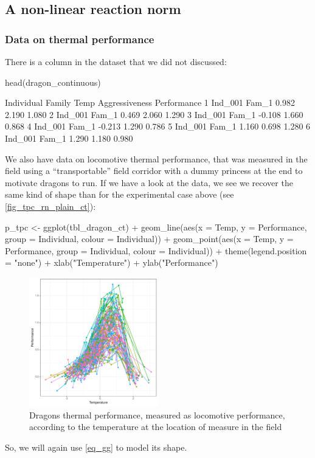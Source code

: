 \documentclass[a4paper,12pt,twoside]{article}
\begin{document}
\subsection{A non-linear reaction norm}

\subsubsection{Data on thermal performance}
There is a column in the dataset that we did not discussed:
\begin{Rinput}
head(dragon_continuous)
\end{Rinput}
\begin{Routput}
  Individual Family   Temp Aggressiveness Performance
1    Ind_001  Fam_1  0.982          2.190       1.080
2    Ind_001  Fam_1  0.469          2.060       1.290
3    Ind_001  Fam_1 -0.108          1.660       0.868
4    Ind_001  Fam_1 -0.213          1.290       0.786
5    Ind_001  Fam_1  1.160          0.698       1.280
6    Ind_001  Fam_1  1.290          1.180       0.980
\end{Routput}
We also have data on locomotive thermal performance, that was measured in the field using a ``transportable'' field corridor with a dummy princess at the end to motivate dragons to run.
If we have a look at the data, we see we recover the same kind of shape than for the experimental case above (see \autoref{fig_tpc_rn_plain_ct}):
\begin{Rinput}
p_tpc <-
    ggplot(tbl_dragon_ct) +
    geom_line(aes(x = Temp, y = Performance, group = Individual, colour = Individual)) +
    geom_point(aes(x = Temp, y = Performance, group = Individual, colour = Individual)) +
    theme(legend.position = "none") +
    xlab("Temperature") + ylab("Performance")
\end{Rinput}
%
\begin{figure}[b!h!t!]
  \includegraphics[width = 0.5\textwidth]{TPC_continuous.pdf}
  \caption{Dragons thermal performance, measured as locomotive performance,  according to the temperature at the location of measure in the field}
  \label{fig_tpc_rn_plain_ct}
\end{figure}
So, we will again use \autoref{eq_gg} to model its shape.
\end{document}
